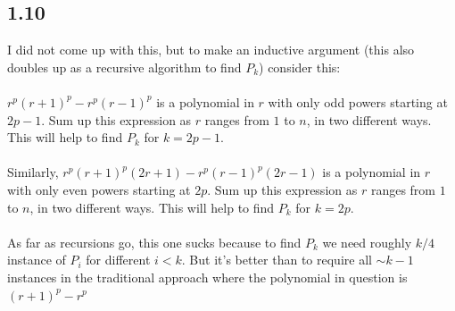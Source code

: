 \documentclass{article}
\begin{document}
\subsection*{1.10}
I did not come up with this, but to make an inductive argument (this also doubles up as a recursive algorithm to find $P_k$) consider this:
\\\\
$r^p(r+1)^p - r^p(r-1)^p$ is a polynomial in $r$ with only odd powers starting at $2p-1$. Sum up this expression as $r$ ranges from $1$ to $n$, in two different ways. This will help to find $P_k$ for $k = 2p-1$.
\\\\
Similarly, $r^p(r+1)^p(2r+1) - r^p(r-1)^p(2r-1)$ is a polynomial in $r$ with only even powers starting at $2p$. Sum up this expression as $r$ ranges from $1$ to $n$, in two different ways. This will help to find $P_k$ for $k = 2p$.
\\\\
As far as recursions go, this one sucks because to find $P_k$ we need roughly $k/4$ instance of $P_i$ for different $i<k$. But it's better than to require all $\sim k-1$ instances in the traditional approach where the polynomial in question is $(r+1)^p-r^p$
\end{document}
